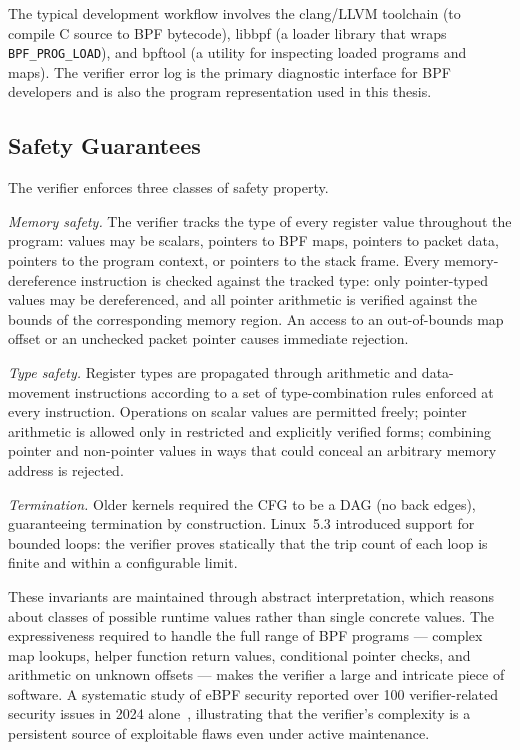 The typical development workflow involves the clang/LLVM toolchain (to compile C
source to BPF bytecode), libbpf (a loader library that wraps
\texttt{BPF\_PROG\_LOAD}), and bpftool (a utility for inspecting loaded programs
and maps).
The verifier error log is the primary diagnostic interface for BPF developers and
is also the program representation used in this thesis.

\subsection{Safety Guarantees}
\label{sec:ebpf-safety}

The verifier enforces three classes of safety property.

\emph{Memory safety.}
The verifier tracks the type of every register value throughout the program: values
may be scalars, pointers to BPF maps, pointers to packet data, pointers to the
program context, or pointers to the stack frame.
Every memory-dereference instruction is checked against the tracked type: only
pointer-typed values may be dereferenced, and all pointer arithmetic is verified
against the bounds of the corresponding memory region.
An access to an out-of-bounds map offset or an unchecked packet pointer causes
immediate rejection.

\emph{Type safety.}
Register types are propagated through arithmetic and data-movement instructions
according to a set of type-combination rules enforced at every instruction.
Operations on scalar values are permitted freely; pointer arithmetic is allowed
only in restricted and explicitly verified forms; combining pointer and
non-pointer values in ways that could conceal an arbitrary memory address is
rejected.

\emph{Termination.}
Older kernels required the CFG to be a DAG (no back edges), guaranteeing
termination by construction.
Linux~5.3 introduced support for bounded loops: the verifier proves statically
that the trip count of each loop is finite and within a configurable limit.

These invariants are maintained through abstract interpretation, which reasons
about classes of possible runtime values rather than single concrete values.
The expressiveness required to handle the full range of BPF programs --- complex
map lookups, helper function return values, conditional pointer checks, and
arithmetic on unknown offsets --- makes the verifier a large and intricate piece
of software.
A systematic study of eBPF security reported over 100 verifier-related security
issues in 2024 alone~\cite{sok-ebpf}, illustrating that the verifier's complexity
is a persistent source of exploitable flaws even under active maintenance.

